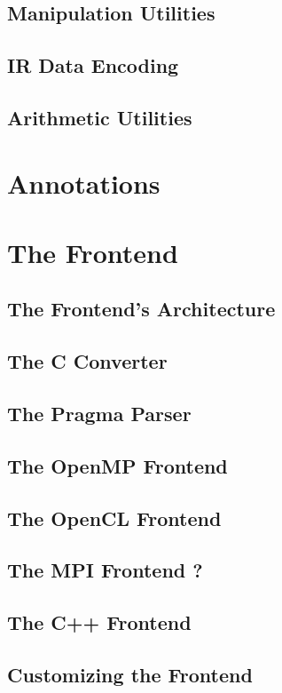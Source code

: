 \subsection{Manipulation Utilities}
\label{sec:Compiler.Core.Manipulation}
\subsection{IR Data Encoding}
\label{sec:Compiler.Core.Encoding}
\subsection{Arithmetic Utilities}
\label{sec:Compiler.Core.Arithmetic}



\section{Annotations}

\section{The Frontend}
\subsection{The Frontend's Architecture}
\subsection{The C Converter}
\subsection{The Pragma Parser}
\subsection{The OpenMP Frontend}
\subsection{The OpenCL Frontend}
\subsection{The MPI Frontend ?}
\subsection{The C++ Frontend}
\subsection{Customizing the Frontend}

